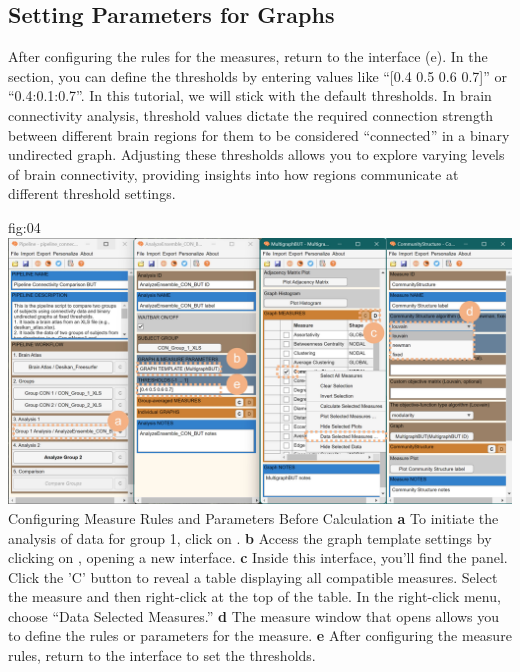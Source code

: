 \documentclass[justified]{tufte-handout}
\begin{document}
\subsection{Setting Parameters for Graphs}

After configuring the rules for the measures, return to the  interface (e). 
In the  section, you can define the thresholds by entering values like “[0.4 0.5 0.6 0.7]” or “0.4:0.1:0.7”. 
In this tutorial, we will stick with the default thresholds. 
In brain connectivity analysis, threshold values dictate the required connection strength between different brain regions for them to be considered “connected” in a binary undirected graph. 
Adjusting these thresholds allows you to explore varying levels of brain connectivity, providing insights into how regions communicate at different threshold settings.

{fig:04}
{
\includegraphics{fig04.jpg}
}
{Configuring Measure Rules and Parameters Before Calculation}
{
{\bf a} To initiate the analysis of data for group 1, click on .
{\bf b} Access the graph template settings by clicking on , opening a new interface.
{\bf c} Inside this interface, you'll find the  panel. Click the 'C' button to reveal a table displaying all compatible measures. Select the  measure and then right-click at the top of the table. In the right-click menu, choose “Data Selected Measures.”
{\bf d} The measure window that opens allows you to define the rules or parameters for the  measure.
{\bf e} After configuring the measure rules, return to the  interface to set the thresholds.
}
\end{document}
